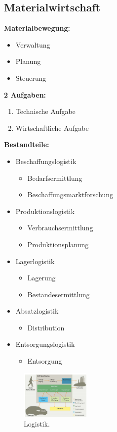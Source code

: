 \documentclass[../ZF_Wing.tex]{subfiles}
\begin{document}
\subsection{Materialwirtschaft}
\colorbox{blue!30}{\textbf{Materialbewegung:}}
\begin{itemize}
	\item Verwaltung
	\item Planung
	\item Steuerung
	
\end{itemize}
\colorbox{blue!30}{\textbf{2 Aufgaben:}}
\begin{enumerate}
	\item Technische Aufgabe
	\item Wirtschaftliche Aufgabe

\end{enumerate}
\colorbox{blue!30}{\textbf{Bestandteile:}}
\begin{itemize}
	\item Beschaffungslogistik
	\begin{itemize}
		\item Bedarfsermittlung
		\item Beschaffungsmarktforschung
	\end{itemize}
	\item Produktionslogistik
	\begin{itemize}
		\item Verbrauchsermittlung
		\item Produktionsplanung
	\end{itemize}
	\item Lagerlogistik
	\begin{itemize}
		\item Lagerung
		\item Bestandesermittlung
	\end{itemize}
	\item Absatzlogistik
	\begin{itemize}
		\item Distribution
	\end{itemize}
	\item Entsorgungslogistik
	\begin{itemize}
		\item Entsorgung
	\end{itemize}
\end{itemize}


\begin{figure}[H]
\centering
\includegraphics[width=0.3\textwidth]{Resources/Image/Logistik.png}
\caption{\label{fig:GliederungER}Logistik.}
\end{figure}
\end{document}
